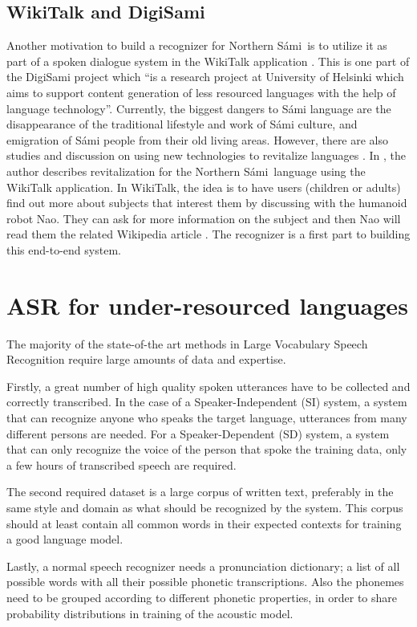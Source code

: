 \documentclass[b5paper]{article}
\newcommand{\ns}{Northern Sámi}
\begin{document}
\subsection{WikiTalk and DigiSami}
Another motivation to build a recognizer for \ns\ is to utilize it as part of  a spoken dialogue system in the WikiTalk application \cite{wilcock2013wikitalk}. This is one part of the DigiSami project which ``is a research project at University of Helsinki which aims to support content generation of less resourced languages with the help of language technology''. Currently, the biggest dangers to Sámi language are the disappearance of the traditional lifestyle and work of Sámi culture, and emigration of Sámi people from their old living areas. However, there are also studies and discussion on using new technologies to revitalize languages \cite{eisenlohr2004language}. In \cite{jokinen2014open}, the author describes revitalization for the \ns\ language using the WikiTalk application. In WikiTalk, the idea is to have users (children or adults) find out more about subjects that interest them by discussing with the humanoid robot Nao. They can ask for more information on the subject and then Nao will read them the related Wikipedia article \cite{jokinen2014multimodal}. The recognizer is a first part to building this end-to-end system.


\section{ASR for under-resourced languages}
The majority of the state-of-the art methods in Large Vocabulary Speech Recognition require large amounts of data and expertise. 

Firstly, a great number of high quality spoken utterances have to be collected and correctly transcribed. In the case of  a Speaker-Independent (SI) system, a system that can recognize anyone who speaks the target language, utterances from many different persons are needed. For a Speaker-Dependent (SD) system, a system that can only recognize the voice of the person that spoke the training data, only a few hours of transcribed speech are required.

The second required dataset is a large corpus of written text, preferably in the same style and domain as what should be recognized by the system. This corpus should at least contain all common words in their expected contexts for training a good language model.

Lastly, a normal speech recognizer needs a pronunciation dictionary; a list of all possible words with all their possible phonetic transcriptions. Also the phonemes need to be grouped according to different phonetic properties, in order to share probability distributions in  training of the acoustic model.
\end{document}
